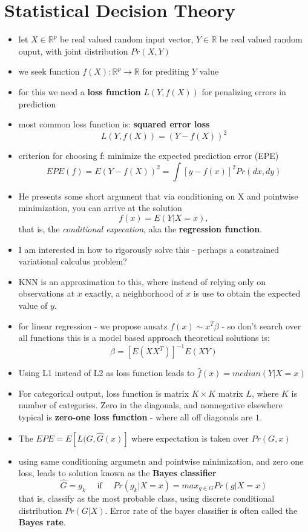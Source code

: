 \documentclass[a4paper]{report}
\newcommand{\<}{\textless}
\renewcommand{\>}{\textgreater}
\def\reals{\mathbb{R}}
\begin{document}
\section{Statistical Decision Theory}
\begin{itemize}
  \item let $X \in \reals^p$ be real valued random input vector, $Y \in \reals$ be real valued random ouput, with joint distribution $Pr(X,Y)$
  \item we seek function $f(X):\reals^p \to \reals$ for prediting $Y$ value
  \item for this we need a {\bf loss function} $L(Y, f(X))$ for penalizing errors in prediction
  \item most common loss function is: {\bf squared error loss} 
    $$ L(Y, f(X)) = (Y - f(X))^2 $$
  \item criterion for choosing f: minimize the expected prediction error (EPE)
    $$ EPE(f) = E(Y-f(X))^2 = \int [y - f(x)]^2 Pr(dx,dy) $$
  \item He presents some short argument that via conditioning on X and pointwise minimization, you can arrive at the solution
    $$ f(x) = E(Y | X = x), $$
    that is, the \emph{conditional expecation}, aka the {\bf regression function}.
  \item {\color{gray} I am interested in how to rigorously solve this - perhaps a constrained variational calculus problem?}
  \item KNN is an approximation to this, where instead of relying only on observations at $x$ exactly, a neighborhood of $x$ is use to obtain the expected value of $y$.
  \item for linear regression - we propose ansatz $f(x) \sim x^T \beta$ -  so don't search over all functions
    \subitem this is a model based approach
    \subitem theoretical solutions is:
    $$ \beta = \left[ E(XX^T)\right]^{-1} E(XY) $$
  \item Using L1 instead of L2 as loss function leads to $ \hat{f}(x) = median(Y| X = x)$
  \item For categorical output, loss function is matrix $K\times K$ matrix $L$, where $K$ is number of categories. Zero in the diagonals, and nonnegative elsewhere
    \subitem typical is {\bf zero-one loss function} - where all off diagonals are $1$.
  \item The $EPE = E[L(G, \hat{G}(x)]$ where expectation is taken over $Pr(G, x)$
    \item using same conditioning argumetn and pointwise minimization, and zero one loss, leads to solution known as the {\bf Bayes classifier}
      $$ \hat{G} = g_k \quad \mbox{ if } \quad Pr(g_k | X = x) = max_{g \in G} Pr(g | X = x) $$
      that is, classify as the most probable class, using discrete conditional distribution $Pr(G|X)$.
      \subitem Error rate of the bayes classifier is often called the {\bf Bayes rate}.
\end{itemize}
\end{document}

